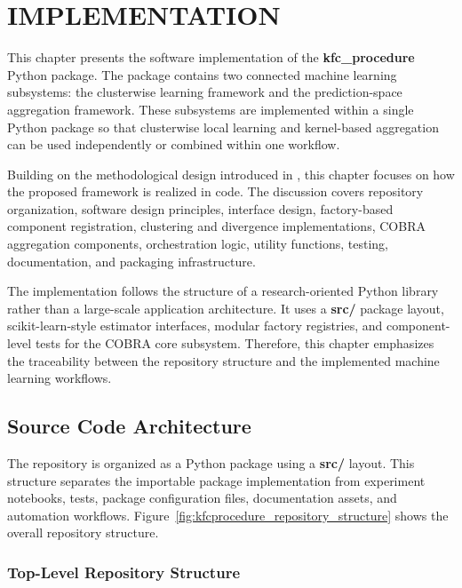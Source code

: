 \chapter{IMPLEMENTATION}
\label{ch:implementation}


\hs This chapter presents the software implementation of the \textbf{kfc\_procedure} Python package. The package contains two connected machine learning subsystems: the \KFCProcedure{} clusterwise learning framework and the \GradientCOBRA{} prediction-space aggregation framework. These subsystems are implemented within a single Python package so that clusterwise local learning and kernel-based aggregation can be used independently or combined within one workflow.


Building on the methodological design introduced in , this chapter focuses on how the proposed framework is realized in code. The discussion covers repository organization, software design principles, interface design, factory-based component registration, clustering and divergence implementations, COBRA aggregation components, orchestration logic, utility functions, testing, documentation, and packaging infrastructure.

The implementation follows the structure of a research-oriented Python library rather than a large-scale application architecture. It uses a \textbf{src/} package layout, scikit-learn-style estimator interfaces, modular factory registries, and component-level tests for the COBRA core subsystem. Therefore, this chapter emphasizes the traceability between the repository structure and the implemented machine learning workflows.

\section{Source Code Architecture}
\label{sec:repository_architecture}

\hs The repository is organized as a Python package using a \textbf{src/} layout. This structure separates the importable package implementation from experiment notebooks, tests, package configuration files, documentation assets, and automation workflows. Figure~\ref{fig:kfcprocedure_repository_structure} shows the overall repository structure.

\subsection{Top-Level Repository Structure}

